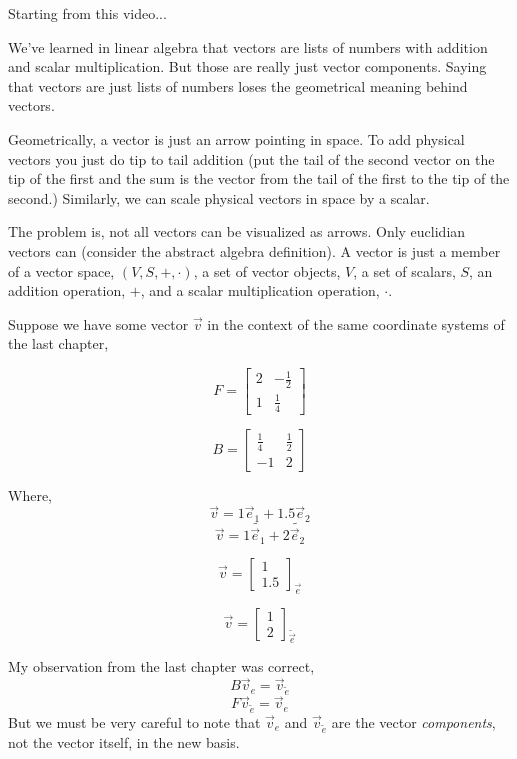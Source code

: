 \documentclass[12pt]{book}
\theoremstyle{plain}
\theoremstyle{definition}
\theoremstyle{ppart}
\theoremstyle{case}
\theoremstyle{solution}
\begin{document}
Starting from this \cite{youtube:tensor2} video...

We've learned in linear algebra that vectors are lists of numbers with addition and scalar multiplication.
But those are really just vector components.
Saying that vectors are just lists of numbers loses the geometrical meaning behind vectors.

Geometrically, a vector is just an arrow pointing in space. 
To add physical vectors you just do tip to tail addition (put the tail of the second vector on the tip of the first and
the sum is the vector from the tail of the first to the tip of the second.)
Similarly, we can scale physical vectors in space by a scalar. 

The problem is, not all vectors can be visualized as arrows. Only euclidian vectors can (consider the abstract
algebra definition). A vector is just a member of a vector space, $(V,S,+,\cdot)$, a set of vector objects, $V$,
a set of scalars, $S$, an addition operation, $+$, and a scalar multiplication operation, $\cdot$.

Suppose we have some vector $\vec{v}$ in the context of the same coordinate systems of the last chapter,

\[
  F =
  \begin{bmatrix}
  2 & -\frac{1}{2} \\
  1 & \frac{1}{4}
  \end{bmatrix}
\]

\[
  B =
  \begin{bmatrix}
  \frac{1}{4} & \frac{1}{2} \\
  -1 & 2 
  \end{bmatrix}
\]

Where,
\[ \vec{v} = 1 \vec{e}_1 + 1.5 \vec{e}_2 \]
\[ \vec{v} = 1 \widetilde{\vec{e}_1} + 2 \widetilde{\vec{e}_2} \]

\[ \vec{v} = 
  \begin{bmatrix}
  1 \\
  1.5
  \end{bmatrix}_{\vec{e}}
\]

\[ \vec{v} = 
  \begin{bmatrix}
  1 \\
  2 
  \end{bmatrix}_{\widetilde{\vec{e}}}
\]


My observation from the last chapter was correct,
\label{change_vector_basis}
\[ B \vec{v}_{e} = \vec{v}_{\widetilde{e}} \]
\[ F \vec{v}_{\widetilde{e}} = \vec{v}_{e} \]
But we must be very careful to note that $\vec{v}_{e}$ and $\vec{v}_{\widetilde{e}}$ are the vector {\em{components}}, not the vector itself, in the new basis.
\end{document}
